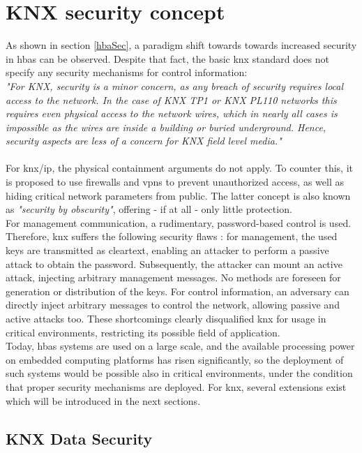 \section{KNX security concept}
As shown in section \ref{hbaSec}, a paradigm shift towards towards increased security in \gls{hbas} can be observed. 
Despite that fact, the basic \gls{knx} standard does not specify any security mechanisms for control information:
\\

\textit{"For KNX, security is a minor concern, as any breach of security requires local access to the network. 
In the case of KNX TP1 or KNX PL110 networks this requires even physical access to the network wires,
which in nearly all cases is impossible as the wires are inside a building or buried underground.
Hence, security aspects are less of a concern for KNX field level media."} \cite{knxSpec}
\\
\\
For \gls{knx}/\gls{ip}, the physical containment arguments do not apply. To counter this, it is proposed to use firewalls and \glspl{vpn} to prevent unauthorized access,
as well as hiding critical network parameters from public. The latter concept is also known as \textit{"security by obscurity"}, offering - if at all - only 
little protection.
\\
For management communication, a rudimentary, password-based control is used. Therefore, \gls{knx} suffers the following security flaws 
\cite{Granzer05securityin}: for management, the 
used keys are transmitted as cleartext, enabling an attacker to perform a passive attack to obtain the password. Subsequently, the attacker can mount an active
attack, injecting
arbitrary management messages. No methods are foreseen for generation or distribution of the keys.
For control information, an adversary can directly inject arbitrary messages to control the network, allowing passive and active attacks too.
These shortcomings clearly disqualified \gls{knx} for usage in critical environments, restricting its possible field of application.
\\
Today, \gls{hbas} systems are used on a large scale, and the available processing power on embedded computing platforms has risen significantly, so the deployment
of such systems would be possible also in critical environments, under the condition that proper security mechanisms are deployed. For \gls{knx}, several extensions
exist which will be introduced in the next sections.

\subsection{KNX Data Security}

